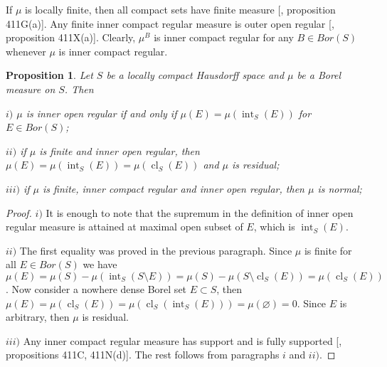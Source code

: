 \documentclass[12pt]{article}
\newtheorem{proposition}[theorem]{Proposition}
\begin{document}
If $\mu$ is locally finite, then all compact sets have finite measure [\cite{FremMeasTh4.1}, proposition 411G(a)]. Any finite inner compact regular measure is outer open regular [\cite{FremMeasTh4.1}, proposition 411X(a)]. Clearly, $\mu^B$ is inner compact regular for any $B\in Bor(S)$ whenever $\mu$ is inner compact regular.

\begin{proposition}\label{InnerOpenRegMeasCharac} Let $S$ be a locally compact Hausdorff space and $\mu$ be a Borel measure on $S$. Then

    $i)$ $\mu$ is inner open regular if and only if $\mu(E)=\mu(\operatorname{int}_S(E))$ for $E\in Bor(S)$;

    $ii)$ if $\mu$ is finite and inner open regular, then $\mu(E)=\mu(\operatorname{int}_S(E))=\mu(\operatorname{cl}_S(E))$ and $\mu$ is residual;

    $iii)$ if $\mu$ is finite, inner compact regular and inner open regular, then $\mu$ is normal;
\end{proposition}
\begin{proof} $i)$ It is enough to note that the supremum in the definition of inner open regular measure is attained at maximal open subset of $E$, which is $\operatorname{int}_S(E)$.

    $ii)$ The first equality was proved in the previous paragraph. Since $\mu$ is finite for all $E\in Bor(S)$ we have $\mu(E)=\mu(S)-\mu(\operatorname{int}_S(S\setminus E))=\mu(S)-\mu(S\setminus \operatorname{cl}_S(E))=\mu(\operatorname{cl}_S(E))$. Now consider a nowhere dense Borel set $E\subset S$, then $\mu(E)=\mu(\operatorname{cl}_S(E))=\mu(\operatorname{cl}_S(\operatorname{int}_S(E)))=\mu(\varnothing)=0$. Since $E$ is arbitrary, then $\mu$ is residual.

    $iii)$ Any inner compact regular measure has support and is fully supported [\cite{FremMeasTh4.1}, propositions 411C, 411N(d)]. The rest follows from paragraphs $i$ and $ii)$.
\end{proof}
\end{document}
